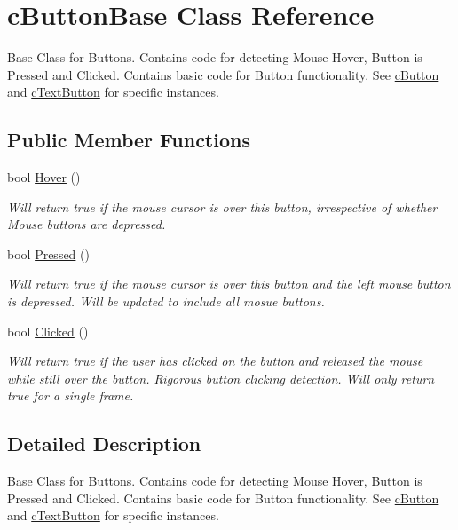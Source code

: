 \hypertarget{classc_button_base}{
\section{cButtonBase Class Reference}
\label{classc_button_base}
}


Base Class for Buttons. Contains code for detecting Mouse Hover, Button is Pressed and Clicked. Contains basic code for Button functionality. See \hyperlink{classc_button}{cButton} and \hyperlink{classc_text_button}{cTextButton} for specific instances.  


\subsection*{Public Member Functions}
\begin{DoxyCompactItemize}
\item 
\hypertarget{classc_button_base_a3892d82fdc13e373d1b4474ddc0270c3}{
bool \hyperlink{classc_button_base_a3892d82fdc13e373d1b4474ddc0270c3}{Hover} ()}
\label{classc_button_base_a3892d82fdc13e373d1b4474ddc0270c3}

\begin{DoxyCompactList}\small\item\em Will return true if the mouse cursor is over this button, irrespective of whether Mouse buttons are depressed. \end{DoxyCompactList}\item 
\hypertarget{classc_button_base_ac57abb1adc326c84d2398404f9209acd}{
bool \hyperlink{classc_button_base_ac57abb1adc326c84d2398404f9209acd}{Pressed} ()}
\label{classc_button_base_ac57abb1adc326c84d2398404f9209acd}

\begin{DoxyCompactList}\small\item\em Will return true if the mouse cursor is over this button and the left mouse button is depressed. Will be updated to include all mosue buttons. \end{DoxyCompactList}\item 
\hypertarget{classc_button_base_a29e4b282201b863b55a80fd8844f39b4}{
bool \hyperlink{classc_button_base_a29e4b282201b863b55a80fd8844f39b4}{Clicked} ()}
\label{classc_button_base_a29e4b282201b863b55a80fd8844f39b4}

\begin{DoxyCompactList}\small\item\em Will return true if the user has clicked on the button and released the mouse while still over the button. Rigorous button clicking detection. Will only return true for a single frame. \end{DoxyCompactList}\end{DoxyCompactItemize}


\subsection{Detailed Description}
Base Class for Buttons. Contains code for detecting Mouse Hover, Button is Pressed and Clicked. Contains basic code for Button functionality. See \hyperlink{classc_button}{cButton} and \hyperlink{classc_text_button}{cTextButton} for specific instances. 